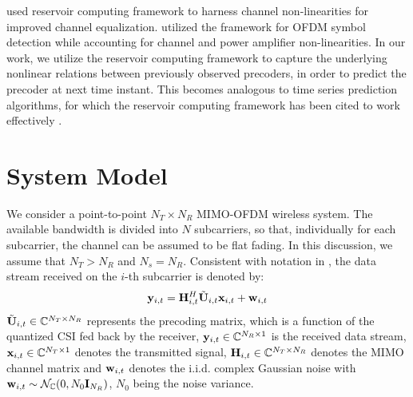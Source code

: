 \documentclass[conference]{IEEEtran}
\begin{document}
\cite{jaeger2004harnessing} used reservoir computing framework to harness channel non-linearities for improved channel equalization.
\cite{mosleh2017brain,shafin2018realizing} utilized the framework for OFDM symbol detection while accounting for channel and power amplifier non-linearities.
In our work, we utilize the reservoir computing framework to capture the underlying nonlinear relations between previously observed precoders, in order to predict the precoder at next time instant. This becomes analogous to time series prediction algorithms, for which the reservoir computing framework has been cited to work effectively \cite{mosleh2017brain}.

\section{System Model}
\label{section2}
We consider a point-to-point $N_T\times N_R$ MIMO-OFDM wireless system.
The available bandwidth is divided into $N$ subcarriers, so that, individually for each subcarrier, the channel can be assumed to be flat fading.
In this discussion, we assume that $N_T > N_R$ and $N_s = N_R$. Consistent with notation in \cite{6891198,Gupt1905:Predictive}, the data stream received on the $i$-th subcarrier is denoted by:
\begin{equation}
{\bf y}_{i,t}={\bf H}^{H}_{i,t}\tilde{{\bf U}}_{i,t}{\bf x}_{i,t}+ {\bf w}_{i,t}
\end{equation}
$\tilde{{\bf U}}_{i,t} \in \mathbb{C}^{N_T \times N_R}$ represents the precoding matrix, which is a function of the quantized CSI fed back by the receiver, ${\bf y}_{i,t} \in \mathbb{C}^{N_R \times 1}$ is the received data stream, ${\bf x}_{i,t} \in \mathbb{C}^{N_T \times 1}$ denotes the transmitted signal, ${\bf H}_{i,t} \in \mathbb{C}^{N_T \times N_R}$ denotes the MIMO channel matrix and ${\bf w}_{i,t}$ denotes the i.i.d. complex Gaussian noise with ${\bf w}_{i,t} \sim \mathcal{N}_{\mathbb{C}}(0,N_0{\bf I}_{N_R})$, $N_0$ being the noise variance.

\end{document}
